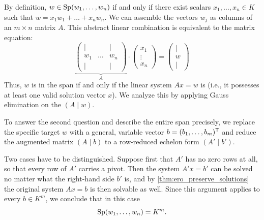 \begin{answer}
By definition, $w \in \operatorname{Sp}(w_{1}, \dots, w_{n})$ if and only if there exist scalars $x_{1}, \dots, x_{n} \in K$ such that $w = x_{1} w_{1} + \dots + x_{n} w_{n}$. We can assemble the vectors $w_{j}$ as columns of an $m \times n$ matrix $A$. This abstract linear combination is equivalent to the matrix equation:
\[
\underbrace{\begin{pmatrix} | & & | \\ w_{1} & \dots & w_{n} \\ | & & | \end{pmatrix}}_{A} \cdot \begin{pmatrix} x_{1} \\ \vdots \\ x_{n} \end{pmatrix} = \begin{pmatrix} | \\ w \\ | \end{pmatrix}
\]
Thus, $w$ is in the span if and only if the linear system $Ax = w$ is  (i.e., it possesses at least one valid solution vector $x$). We analyze this by applying Gauss elimination on the  $(A \mid w)$. 

To answer the second question and describe the entire span precisely, we replace the specific target $w$ with a general, variable vector $b = (b_{1}, \dots, b_{m})^{\mathsf{T}}$ and reduce the augmented matrix $(A \mid b)$ to a row-reduced echelon form $(A' \mid b')$. 

Two cases have to be distinguished. Suppose first that $A'$ has no zero rows at all, so that every row of $A'$ carries a pivot. Then the system $A'x = b'$ can be solved no matter what the right-hand side $b'$ is, and by \cref{thm:ero_preserve_solutions} the original system $Ax = b$ is then solvable as well. Since this argument applies to every $b \in K^{m}$, we conclude that in this case
\[
\operatorname{Sp}(w_{1}, \dots, w_{n}) = K^{m}.
\]


\end{answer}
